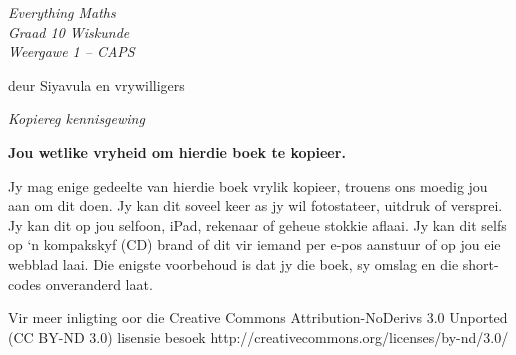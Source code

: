 

\begin{titlepage}
\begin{adjustwidth}{1in}{1in}
\begin{center}
    \thispagestyle{empty}

    \vspace*{4in}

    {\normalfont\sffamily\fontsize{36}\normalfont\itshape{Everything Maths } \\ \vspace*{1cm}
    {\normalfont\sffamily\fontsize{22}\normalfont\itshape{Graad 10 Wiskunde}}
    \vspace*{1in} \\
    \LARGE Weergawe 1 -- CAPS  \\

   {\vspace*{2in}
     deur Siyavula en vrywilligers 
  

\vfill

    }}
\end{center}
\end{adjustwidth}
\end{titlepage}






\newpage
\thispagestyle{empty}
{
\begin{center}
\normalfont\sffamily\fontsize{22}\normalfont\itshape  Kopiereg kennisgewing\\

\vspace*{1in}

\textbf{Jou wetlike vryheid om hierdie boek te kopieer.}\\

\end{center}
}

{\large
Jy mag enige gedeelte van hierdie boek vrylik kopieer, trouens ons moedig jou aan om dit doen. Jy kan dit soveel keer as jy wil fotostateer, uitdruk of versprei. Jy kan dit op jou selfoon, iPad, rekenaar of geheue stokkie aflaai. Jy kan dit selfs op ‘n kompakskyf (CD) brand of dit vir iemand per e-pos aanstuur of op jou eie webblad laai.
Die enigste voorbehoud is dat jy die boek, sy omslag en die short-codes onveranderd laat. \par

Vir meer inligting oor die Creative Commons Attribution-NoDerivs 3.0 Unported (CC BY-ND
3.0) lisensie besoek http://creativecommons.org/licenses/by-nd/3.0/}\\


